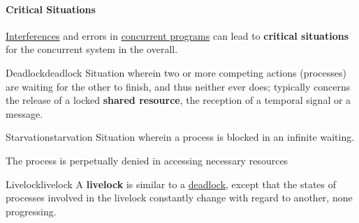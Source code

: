 \paragraph{Critical Situations}\label{par:cp_critical_situations} %
\hyperref[def:interf]{Interferences} and errors in \hyperref[def:conc-prog]{concurrent programs} can lead to \textbf{critical situations} for the concurrent system in the overall.
\begin{definition}{Deadlock}{deadlock}
    Situation wherein two or more competing actions (processes) are waiting for the other to finish, and thus neither ever does; typically concerns the release of a locked \textbf{shared resource}, the reception of a temporal signal or a message.
    \begin{critical}
    \end{critical}
\end{definition}
\begin{definition}{Starvation}{starvation}
    Situation wherein a process is blocked in an infinite waiting.
    \begin{note}
        The process is perpetually denied in accessing necessary resources
    \end{note}
    \begin{critical}
    \end{critical}
\end{definition}
\begin{definition}{Livelock}{livelock}
    A \textbf{livelock} is similar to a \hyperref[def:deadlock]{deadlock}, except that the states of processes involved in the livelock constantly change with regard to another, none progressing.
\end{definition}
%
